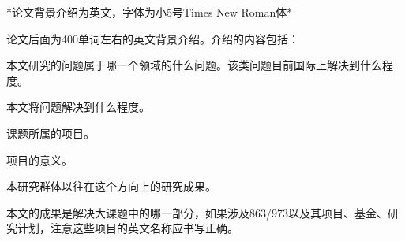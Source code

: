 \begin{background}
  *论文背景介绍为英文，字体为小5号Times New Roman体*

  论文后面为400单词左右的英文背景介绍。介绍的内容包括：

  本文研究的问题属于哪一个领域的什么问题。该类问题目前国际上解决到什么程度。

  本文将问题解决到什么程度。

  课题所属的项目。

  项目的意义。

  本研究群体以往在这个方向上的研究成果。

  本文的成果是解决大课题中的哪一部分，如果涉及863/973以及其项目、基金、研究计划，注意这些项目的英文名称应书写正确。
\end{background}